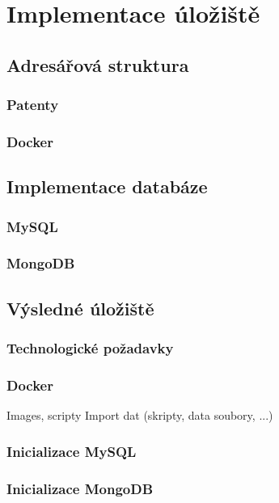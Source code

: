\chapter{Implementace úložiště}

\section{Adresářová struktura}
\subsection{Patenty}
\subsection{Docker}

\section{Implementace databáze}
\subsection{MySQL} \label{subsec:mysql_impl}
\subsection{MongoDB}

\section{Výsledné úložiště}
\subsection{Technologické požadavky}
\subsection{Docker}
Images, scripty \newline
Import dat (skripty, data soubory, ...) 
\subsection{Inicializace MySQL}
\subsection{Inicializace MongoDB}